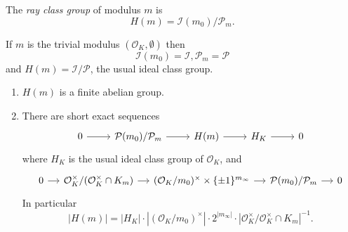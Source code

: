 \documentclass[a4paper]{article}
\renewcommand*{\O}{\mathcal{O}}
\begin{document}
\begin{definition}
  The \emph{ray class group} of modulus \(m\) is
  \[
    H(m) = \mathcal I(m_0)/\mathcal P_m.
  \]
\end{definition}

\begin{remark}
  If \(m\) is the trivial modulus \((\O_K, \emptyset)\) then
  \[
    \mathcal I(m_0) = \mathcal I, \mathcal P_m = \mathcal P
  \]
  and \(H(m) = \mathcal I/\mathcal P\), the usual ideal class group.
\end{remark}

\begin{proposition}\leavevmode
  \begin{enumerate}
  \item \(H(m)\) is a finite abelian group.
  \item There are short exact sequences
    \[
      \begin{tikzcd}
        0 \ar[r] & \mathcal P(m_0)/\mathcal P_m \ar[r] & H(m) \ar[r] & H_K \ar[r] & 0
      \end{tikzcd}
    \]
    where \(H_K\) is the usual ideal class group of \(\O_K\), and
    \[
      \begin{tikzcd}[column sep=small]
        0 \ar[r] & \O_K^\times/(\O_K^\times \cap K_m) \ar[r] & (\O_K/m_0)^\times \times \{\pm 1\}^{m_\infty} \ar[r] & \mathcal P(m_0)/\mathcal P_m \ar[r] & 0
      \end{tikzcd}
    \]
    In particular
    \[
      |H(m)| = |H_K| \cdot |(\O_K/m_0)^\times| \cdot 2^{|m_\infty|} \cdot |\O_K^\times/\O_K^\times \cap K_m|^{-1}.
    \]
  \end{enumerate}
\end{proposition}
\end{document}
